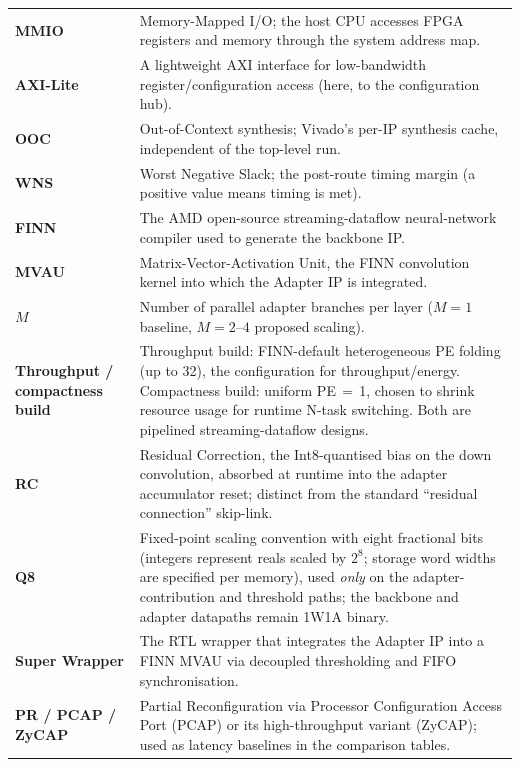 \documentclass[12pt, a4paper]{report}
\numberwithin{equation}{chapter}
\numberwithin{figure}{chapter}
\numberwithin{table}{chapter}
\numberwithin{algorithm}{chapter}
\begin{document}
\begin{longtable}{p{3.2cm}p{12cm}}
\textbf{MMIO} & Memory-Mapped I/O; the host CPU accesses FPGA registers and memory through the system address map. \\
\textbf{AXI-Lite} & A lightweight AXI interface for low-bandwidth register/configuration access (here, to the configuration hub). \\
\textbf{OOC} & Out-of-Context synthesis; Vivado's per-IP synthesis cache, independent of the top-level run. \\
\textbf{WNS} & Worst Negative Slack; the post-route timing margin (a positive value means timing is met). \\
\textbf{FINN} & The AMD open-source streaming-dataflow neural-network compiler used to generate the backbone IP. \\
\textbf{MVAU} & Matrix-Vector-Activation Unit, the FINN convolution kernel into which the Adapter IP is integrated. \\
\textbf{$M$} & Number of parallel adapter branches per layer ($M{=}1$ baseline, $M{=}2$--$4$ proposed scaling). \\
\textbf{Throughput / compactness build} & Throughput build: FINN-default heterogeneous PE folding (up to 32), the configuration for throughput/energy. Compactness build: uniform PE$\,=\,$1, chosen to shrink resource usage for runtime N-task switching. Both are pipelined streaming-dataflow designs. \\
\textbf{RC} & Residual Correction, the Int8-quantised bias on the down convolution, absorbed at runtime into the adapter accumulator reset; distinct from the standard ``residual connection'' skip-link. \\
\textbf{Q8} & Fixed-point scaling convention with eight fractional bits (integers represent reals scaled by $2^{8}$; storage word widths are specified per memory), used \emph{only} on the adapter-contribution and threshold paths; the backbone and adapter datapaths remain 1W1A binary. \\
\textbf{Super Wrapper} & The RTL wrapper that integrates the Adapter IP into a FINN MVAU via decoupled thresholding and FIFO synchronisation. \\
\textbf{PR / PCAP / ZyCAP} & Partial Reconfiguration via Processor Configuration Access Port (PCAP) or its high-throughput variant (ZyCAP); used as latency baselines in the comparison tables. \\
\end{longtable}

\newpage
\listoffigures
\listoftables
\listofalgorithms
\newpage
\end{document}
